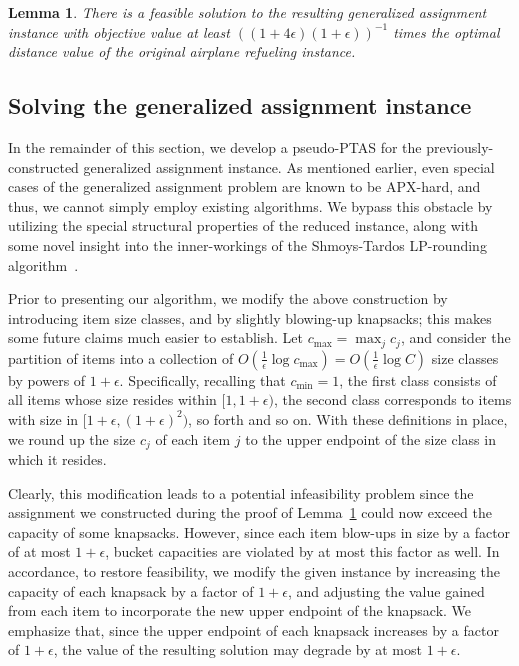 \documentclass[11pt]{article}
\theoremstyle{plain}
\newtheorem{lemma}[theorem]{Lemma}
\theoremstyle{definition}
\begin{document}
\begin{lemma} \label{lemma:ptas_reduction}
There is a feasible solution to the resulting generalized assignment instance with objective value at least  $((1+4\epsilon)(1+\epsilon))^{-1}$ times the optimal distance value of the original airplane refueling instance.
\end{lemma}

\subsection{Solving the generalized assignment instance} \label{subsec:solve_generalized_assign}

In the remainder of this section, we develop a pseudo-PTAS for the previously-constructed generalized assignment instance. As mentioned earlier, even special cases of the generalized assignment problem are known to be APX-hard, and thus, we cannot simply employ existing algorithms. We bypass this obstacle by utilizing the special structural properties of the reduced instance, along with some novel insight into the inner-workings of the Shmoys-Tardos LP-rounding algorithm~\cite{ShmoysT93}.

\smallskip {} Prior to presenting our algorithm, we modify the
above construction by introducing item size classes, and by slightly blowing-up knapsacks; this makes some future claims much easier to establish. Let $c_{\max} = \max_j c_j$, and consider the partition of items into a collection of $O( \frac{ 1 }{ \epsilon } \log  c_{\max} ) = O( \frac{ 1 }{ \epsilon } \log C )$ size classes by powers of $1+\epsilon$. Specifically, recalling that $c_{\min} = 1$, the first class consists of all items whose size resides within $[1,1+\epsilon)$, the second class corresponds to items with size in  $[1+\epsilon,(1+\epsilon)^2)$, so forth and so on. With these definitions in place, we round up the size $c_j$ of each item $j$ to the upper endpoint of the size class in which it resides.

Clearly, this modification leads to a potential infeasibility problem since the assignment we constructed during the proof of Lemma~\ref{lemma:ptas_reduction} could now exceed the capacity of some knapsacks. However, since each item blow-ups in size by a factor of at most $1+\epsilon$, bucket capacities are violated by at most this factor as well. In accordance, to restore feasibility, we modify the given instance by increasing the capacity of each knapsack by a factor of $1+\epsilon$, and adjusting the value gained from each item to incorporate the new upper endpoint of the knapsack. We emphasize that, since the upper endpoint of each knapsack increases by a factor of $1+\epsilon$, the value of the resulting solution may degrade by at most $1+\epsilon$.
\end{document}
